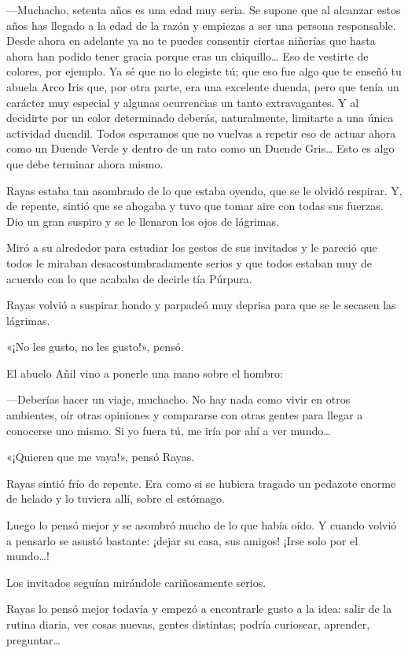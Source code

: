 \documentclass{barcodevapor3pags}
\begin{document}
---Muchacho, setenta años es una edad muy seria. Se supone que al
alcanzar estos años has llegado a la edad de la razón y empiezas a ser
una persona responsable. Desde ahora en adelante ya no te puedes
consentir ciertas niñerías que hasta ahora han podido tener gracia
porque eras un chiquillo\ldots{} Eso de vestirte de colores, por
ejemplo. Ya sé que no lo elegiste tú; que eso fue algo que te enseñó tu
abuela Arco Iris que, por otra parte, era una excelente duenda, pero que
tenía un carácter muy especial y algunas ocurrencias un tanto
extravagantes. Y al decidirte por un color determinado deberás,
naturalmente, limitarte a una única actividad duendil. Todos esperamos
que no vuelvas a repetir eso de actuar ahora como un Duende Verde y
dentro de un rato como un Duende Gris\ldots{} Esto es algo que debe
terminar ahora mismo.

Rayas estaba tan asombrado de lo que estaba oyendo, que se le olvidó
respirar. Y, de repente, sintió que se ahogaba y tuvo que tomar aire con
todas sus fuerzas. Dio un gran suspiro y se le llenaron los ojos de
lágrimas.

Miró a su alrededor para estudiar los gestos de sus invitados y le
pareció que todos le miraban desacostumbradamente serios y que todos
estaban muy de acuerdo con lo que acababa de decirle tía Púrpura.

Rayas volvió a suspirar hondo y parpadeó muy deprisa para que se le
secasen las lágrimas.

«¡No les gusto, no les gusto!», pensó.

El abuelo Añil vino a ponerle una mano sobre el hombro:

---Deberías hacer un viaje, muchacho. No hay nada como vivir en otros
ambientes, oír otras opiniones y compararse con otras gentes para llegar
a conocerse uno mismo. Si yo fuera tú, me iría por ahí a ver
mundo\ldots{}

«¡Quieren que me vaya!», pensó Rayas.

Rayas sintió frío de repente. Era como si se hubiera tragado un pedazote
enorme de helado y lo tuviera allí, sobre el estómago.

Luego lo pensó mejor y se asombró mucho de lo que había oído. Y cuando
volvió a pensarlo se asustó bastante: ¡dejar su casa, sus amigos! ¡Irse
solo por el mundo\ldots!

Los invitados seguían mirándole cariñosamente serios.

Rayas lo pensó mejor todavía y empezó a encontrarle gusto a la idea:
salir de la rutina diaria, ver cosas nuevas, gentes distintas; podría
curiosear, aprender, preguntar\ldots{}
\end{document}
